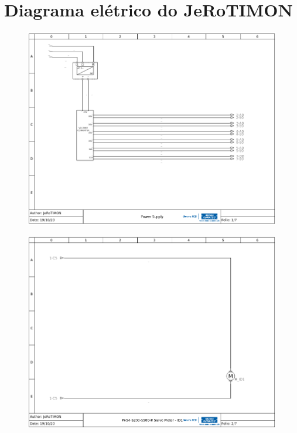 \documentclass[
12pt,					%
openright,				%
twoside,				%
a4paper,				%
english,
brazil
]{ABNT/abntex2_report}
\begin{document}
	
	\chapter{Diagrama elétrico do JeRoTIMON}
	\label{apend:diag_ele}
	\begin{figure}[H]
		\centering
		\includegraphics[scale=0.72]{appendix/wiring_1.png}
		\label{fig:wiring1}
	\end{figure}

	\begin{figure}[H]
		\centering
		\includegraphics[scale=0.72]{appendix/wiring_2.png}
		\label{fig:wiring2}
	\end{figure}
\end{document}
